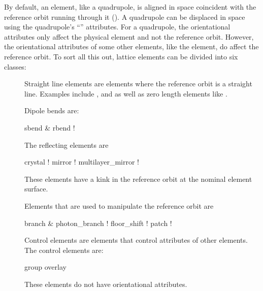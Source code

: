 By default, an element, like a quadrupole, is aligned in space
coincident with the reference orbit running through it
(). A quadrupole can be displaced in space using
the quadrupole's ``'' attributes. For a quadrupole,
the orientational attributes only affect the physical element and not
the reference orbit. However, the orientational attributes of some
other elements, like the  element, do affect the
reference orbit. To sort all this out, lattice elements can be divided
into six classes:
  \begin{description}
  \item[] \Newline
Straight line elements are elements where the reference orbit is a
straight line. Examples include , and 
as well as zero length elements like .
  \item[]  \Newline
Dipole bends are:
\begin{example}
  sbend \& rbend             ! 
\end{example}
  \item[] \Newline
The reflecting elements are
\begin{example}
  crystal                   ! 
  mirror                    ! 
  multilayer_mirror         ! 
\end{example}
These elements have a kink in the reference orbit at the nominal
element surface.
  \item[] \Newline
Elements that are used to manipulate the reference orbit are
\begin{example}
  branch \& photon_branch    ! 
  floor_shift               ! 
  patch                     ! 
\end{example}
  \item[] \Newline
  \item[] \Newline
  \item[] \Newline
Control elements are elements that control attributes of other
elements. The control elements are:
\begin{example}
  group
  overlay
\end{example}
These elements do not have orientational attributes.
  \end{description}

